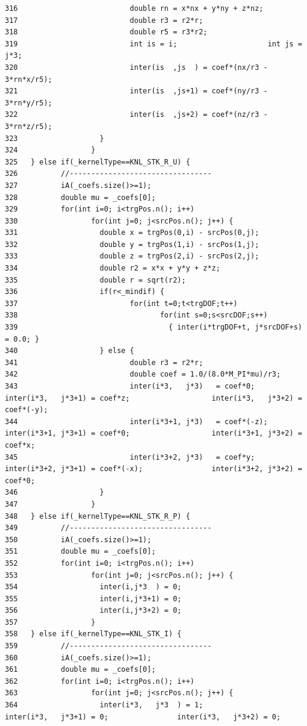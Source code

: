 \begin{verbatim}
316                          double rn = x*nx + y*ny + z*nz;
317                          double r3 = r2*r;
318                          double r5 = r3*r2;
319                          int is = i;                     int js = j*3;
320                          inter(is  ,js  ) = coef*(nx/r3 - 3*rn*x/r5);
321                          inter(is  ,js+1) = coef*(ny/r3 - 3*rn*y/r5);
322                          inter(is  ,js+2) = coef*(nz/r3 - 3*rn*z/r5);
323                   }
324                 }
325   } else if(_kernelType==KNL_STK_R_U) {
326          //---------------------------------
327          iA(_coefs.size()>=1);
328          double mu = _coefs[0];
329          for(int i=0; i<trgPos.n(); i++)
330                 for(int j=0; j<srcPos.n(); j++) {
331                   double x = trgPos(0,i) - srcPos(0,j);
332                   double y = trgPos(1,i) - srcPos(1,j);
333                   double z = trgPos(2,i) - srcPos(2,j);
334                   double r2 = x*x + y*y + z*z;
335                   double r = sqrt(r2);
336                   if(r<_mindif) {
337                          for(int t=0;t<trgDOF;t++)
338                                 for(int s=0;s<srcDOF;s++)
339                                   { inter(i*trgDOF+t, j*srcDOF+s) = 0.0; }
340                   } else {
341                          double r3 = r2*r;
342                          double coef = 1.0/(8.0*M_PI*mu)/r3;
343                          inter(i*3,   j*3)   = coef*0;                   inter(i*3,   j*3+1) = coef*z;                   inter(i*3,   j*3+2) = coef*(-y);
344                          inter(i*3+1, j*3)   = coef*(-z);                inter(i*3+1, j*3+1) = coef*0;                   inter(i*3+1, j*3+2) = coef*x;
345                          inter(i*3+2, j*3)   = coef*y;                   inter(i*3+2, j*3+1) = coef*(-x);                inter(i*3+2, j*3+2) = coef*0;
346                   }
347                 }
348   } else if(_kernelType==KNL_STK_R_P) {
349          //---------------------------------
350          iA(_coefs.size()>=1);
351          double mu = _coefs[0];
352          for(int i=0; i<trgPos.n(); i++)
353                 for(int j=0; j<srcPos.n(); j++) {
354                   inter(i,j*3  ) = 0;
355                   inter(i,j*3+1) = 0;
356                   inter(i,j*3+2) = 0;
357                 }
358   } else if(_kernelType==KNL_STK_I) {
359          //---------------------------------
360          iA(_coefs.size()>=1);
361          double mu = _coefs[0];
362          for(int i=0; i<trgPos.n(); i++)
363                 for(int j=0; j<srcPos.n(); j++) {
364                   inter(i*3,   j*3  ) = 1;               inter(i*3,   j*3+1) = 0;                inter(i*3,   j*3+2) = 0;

\end{verbatim}
